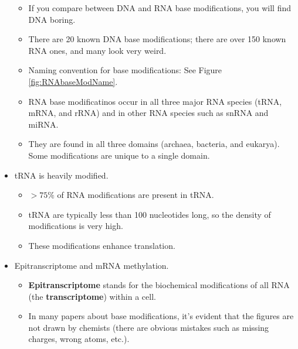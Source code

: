\documentclass[../notes.tex]{subfiles}
\begin{document}
\begin{itemize}
\begin{figure}[h!]
    \end{figure}
    \begin{itemize}
        \item If you compare between DNA and RNA base modifications, you will find DNA boring.
        \item There are 20 known DNA base modifications; there are over 150 known RNA ones, and many look very weird.
        \item Naming convention for base modifications: See Figure \ref{fig:RNAbaseModName}.
        \item RNA base modificatinos occur in all three major RNA species (tRNA, mRNA, and rRNA) and in other RNA species such as snRNA and miRNA.
        \item They are found in all three domains (archaea, bacteria, and eukarya). Some modifications are unique to a single domain.
    \end{itemize}
    \item tRNA is heavily modified.
    \begin{itemize}
        \item $>75\%$ of RNA modifications are present in tRNA.
        \item tRNA are typically less than 100 nucleotides long, so the density of modifications is very high.
        \item These modifications enhance translation.
    \end{itemize}
    \item Epitranscriptome and mRNA methylation.
    \begin{itemize}
        \item \textbf{Epitranscriptome} stands for the biochemical modifications of all RNA (the \textbf{transcriptome}) within a cell.
        \item In many papers about base modifications, it's evident that the figures are not drawn by chemists (there are obvious mistakes such as missing charges, wrong atoms, etc.).
    \end{itemize}
\end{itemize}
\end{document}

